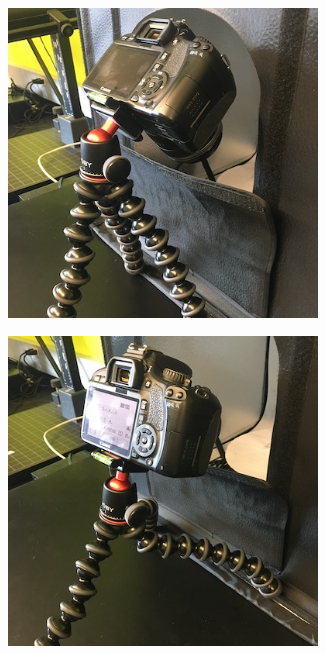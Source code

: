 \documentclass[10pt,letter,english]{article}
\begin{document}

\begin{figure}[H]
\centering
\begin{subfigure}[t]{.33\textwidth}
  \centering
  \includegraphics[width=0.9\textwidth]{Figures/camera_position_1.JPG}
  \caption{}
  \label{}
\end{subfigure}%
\begin{subfigure}[t]{.33\textwidth}
  \centering
  \includegraphics[width=0.9\textwidth]{Figures/camera_position_2.JPG}

\end{subfigure}
\end{figure}
\end{document}
